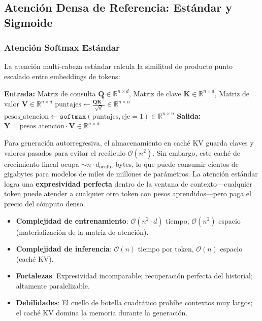 \documentclass[11pt,a4paper]{article}
\begin{document}
\subsection{Atención Densa de Referencia: Estándar y Sigmoide}

\subsubsection{Atención Softmax Estándar}
La atención multi-cabeza estándar \citep{vaswani_attention_2017} calcula la similitud de producto punto escalado entre embeddings de tokens:

\begin{algorithmic}[1]
\State \textbf{Entrada:} Matriz de consulta $\mathbf{Q} \in \mathbb{R}^{n \times d}$, Matriz de clave $\mathbf{K} \in \mathbb{R}^{n \times d}$, Matriz de valor $\mathbf{V} \in \mathbb{R}^{n \times d}$
\State $\text{puntajes} \gets \frac{\mathbf{Q}\mathbf{K}^\top}{\sqrt{d}} \in \mathbb{R}^{n \times n}$ 
\State $\text{pesos\_atencion} \gets \texttt{softmax}(\text{puntajes}, \text{eje}=1) \in \mathbb{R}^{n \times n}$ 
\State \textbf{Salida:} $\mathbf{Y} = \text{pesos\_atencion} \cdot \mathbf{V} \in \mathbb{R}^{n \times d}$ 
\end{algorithmic}

Para generación autorregresiva, el almacenamiento en caché KV guarda claves y valores pasados para evitar el recálculo $\mathcal{O}(n^2)$. Sin embargo, este caché de crecimiento lineal ocupa $\sim n \cdot d_{\text{oculto}}$ bytes, lo que puede consumir cientos de gigabytes para modelos de miles de millones de parámetros. La atención estándar logra una \textbf{expresividad perfecta} dentro de la ventana de contexto---cualquier token puede atender a cualquier otro token con pesos aprendidos---pero paga el precio del cómputo denso.

\begin{itemize}[leftmargin=*]
    \item \textbf{Complejidad de entrenamiento}: $\mathcal{O}(n^2 \cdot d)$ tiempo, $\mathcal{O}(n^2)$ espacio (materialización de la matriz de atención).
    \item \textbf{Complejidad de inferencia}: $\mathcal{O}(n)$ tiempo por token, $\mathcal{O}(n)$ espacio (caché KV).
    \item \textbf{Fortalezas}: Expresividad incomparable; recuperación perfecta del historial; altamente paralelizable.
    \item \textbf{Debilidades}: El cuello de botella cuadrático prohíbe contextos muy largos; el caché KV domina la memoria durante la generación.
\end{itemize}
\end{document}
